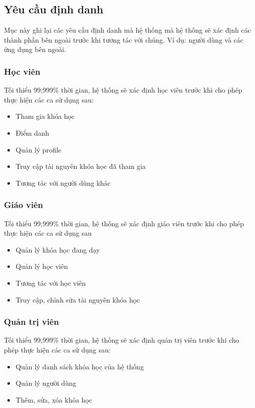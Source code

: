 \documentclass[./../main_file.tex]{subfiles}
\begin{document}
	
	\subsection{Yêu cầu định danh}
	Mục này ghi lại các yêu cầu định danh mà hệ thống mà hệ thống sẽ xác định các thành phần bên ngoài trước khi tương tác với chúng. Ví dụ: người dùng và các ứng dụng bên ngoài.
	
	\subsubsection{Học viên}
		Tối thiểu 99,999\% thời gian, hệ thống sẽ xác định học viên trước khi cho phép thực hiện các ca sử dụng sau:
		
		\begin{itemize}
			\item Tham gia khóa học
			\item Điểm danh
			\item Quản lý profile
			\item Truy cập tài nguyên khóa học đã tham gia
			\item Tương tác với người dùng khác
			
		\end{itemize}
	
	\subsubsection{Giáo viên}
		Tối thiểu 99,999\% thời gian, hệ thống sẽ xác định giáo viên trước khi cho phép thực hiện các ca sử dụng sau
		\begin{itemize}
			\item Quản lý khóa học đang dạy
			\item Quản lý học viên
			\item Tương tác với học viên
			\item Truy cập, chỉnh sửa tài nguyên khóa học
			
		\end{itemize}
	
	\subsubsection{Quản trị viên}
		Tối thiểu 99,999\% thời gian, hệ thống sẽ xác định quản trị viên trước khi cho phép thực hiện các ca sử dụng sau:
		
		\begin{itemize}
			\item Quản lý danh sách khóa học của hệ thống
			\item Quản lý người dùng
			\item Thêm, sửa, xóa khóa học
		\end{itemize}
	
\end{document}

